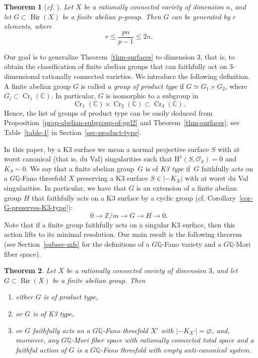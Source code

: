 \documentclass[11pt]{amsart}
\numberwithin{equation}{section}
\newtheorem{thm}{Theorem}[section]
\theoremstyle{definition}
\theoremstyle{remark}
\newcommand{\OOO}{\mathscr{O}}
\let\emptyset\varnothing
\newcommand{\lra}{\longrightarrow}
\DeclareMathOperator{\Cr}{Cr}
\DeclareMathOperator{\Bir}{Bir}
\begin{document}
\begin{thm}[\textit{cf.} {\cite[Corollary 11]{KZh24}}]
Let $X$ be a rationally connected variety of dimension $n$, and let $G\subset \Bir(X)$ be a finite abelian $p$-group. Then $G$ can be generated by $r$ elements, where 
\[
r \leq \frac{pn}{p-1}\leq 2n.
\]
\end{thm}

Our goal is to generalize Theorem~\ref{thm-surfaces} to dimension $3$, that is, to obtain the classification of finite abelian groups that can faithfully act on $3$-dimensional rationally connected varieties. We introduce the following definition.  A finite abelian group $G$ is called \emph{a group of product type} if $G\simeq G_1\times G_2$, where $G_i\subset \Cr_i(\mathbb{C})$.  In particular, $G$ is isomorphic to a subgroup in
\[
\Cr_1(\mathbb{C})\times\Cr_2(\mathbb{C})\subset
\Cr_3(\mathbb{C}).
\] 
Hence, the list of groups of product type can be easily deduced from Proposition~\ref{prop-abelian-subgroup-of-pgl2} and Theorem~\ref{thm-surfaces}; see Table~\ref{table-1} in Section~\ref{sec-product-type}. 

In this paper, by a K3 surface we mean a normal projective surface $S$ with at worst canonical (that is, du Val) singularities such that $\mathrm{H}^1(S, \OOO_S)=0$ and $K_S\sim 0$.  We say that a finite abelian group~$G$ is of \emph{K3 type} if~$G$ faithfully acts on a $G\mathbb{Q}$-Fano threefold $X$ preserving a K3 surface $S\in|-K_X|$ with at worst du Val singularities. In particular, we have that $G$ is an extension of a finite abelian group $H$ that faithfully acts on a K3 surface by a cyclic group (cf. Corollary~\ref{cor-G-preserves-K3-type}):
\[
0\lra \mathbb{Z}/m\lra G \lra H\lra 0.
\]
Note that if a finite group faithfully acts on a singular K3 surface, then this action lifts to its minimal resolution.  Our main result is the following theorem (see Section~\ref{subsec-mfs} for the definitions of a $G\mathbb{Q}$-Fano variety and a $G\mathbb{Q}$-Mori fiber space).

\begin{thm}
\label{thm-first-main-thm}
Let $X$ be a rationally connected variety of dimension $3$, and let $G\subset \Bir(X)$ be a finite abelian group. Then 
\begin{enumerate}
\item
either $G$ is of product type, 
\item
or $G$ is of K3 type,
\item
or $G$ faithfully acts on a $G\mathbb{Q}$-Fano threefold $X'$ with $|-K_{X'}|=\emptyset$, and, moreover, any $G\mathbb{Q}$-Mori fiber space with rationally connected total space and a faithful action of $G$ is a $G\mathbb{Q}$-Fano threefold with empty anti-canonical system.
\end{enumerate}
\end{thm}
\end{document}

